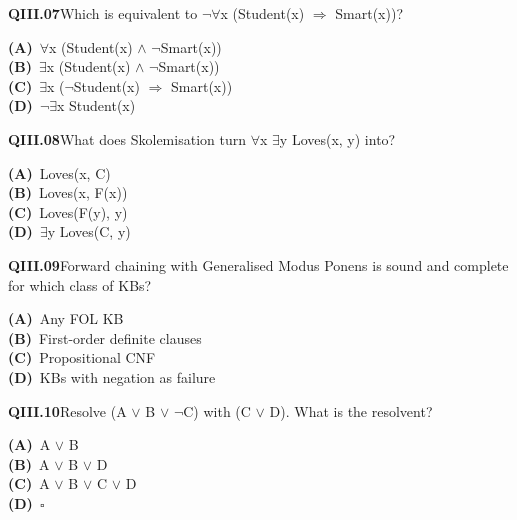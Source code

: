 \begin{tcolorbox}[enhanced,breakable,colback=white,colframe=navyL,arc=2mm,boxrule=0.7pt,left=3mm,right=3mm,top=2mm,bottom=2mm]
\textbf{\color{navy}QIII.07}\quad Which is equivalent to $\neg$$\forall$x (Student(x) $\Rightarrow$ Smart(x))?\hfill{}\par\smallskip
{\small \textbf{\color{navyL}(A)}\ $\forall$x (Student(x) $\wedge$ $\neg$Smart(x))\\[1pt]\textbf{\color{navyL}(B)}\ $\exists$x (Student(x) $\wedge$ $\neg$Smart(x))\\[1pt]\textbf{\color{navyL}(C)}\ $\exists$x ($\neg$Student(x) $\Rightarrow$ Smart(x))\\[1pt]\textbf{\color{navyL}(D)}\ $\neg$$\exists$x Student(x)}
\end{tcolorbox}
\begin{tcolorbox}[enhanced,breakable,colback=white,colframe=navyL,arc=2mm,boxrule=0.7pt,left=3mm,right=3mm,top=2mm,bottom=2mm]
\textbf{\color{navy}QIII.08}\quad What does Skolemisation turn $\forall$x $\exists$y Loves(x, y) into?\hfill{}\par\smallskip
{\small \textbf{\color{navyL}(A)}\ Loves(x, C)\\[1pt]\textbf{\color{navyL}(B)}\ Loves(x, F(x))\\[1pt]\textbf{\color{navyL}(C)}\ Loves(F(y), y)\\[1pt]\textbf{\color{navyL}(D)}\ $\exists$y Loves(C, y)}
\end{tcolorbox}
\begin{tcolorbox}[enhanced,breakable,colback=white,colframe=navyL,arc=2mm,boxrule=0.7pt,left=3mm,right=3mm,top=2mm,bottom=2mm]
\textbf{\color{navy}QIII.09}\quad Forward chaining with Generalised Modus Ponens is sound and complete for which class of KBs?\hfill{}\par\smallskip
{\small \textbf{\color{navyL}(A)}\ Any FOL KB\\[1pt]\textbf{\color{navyL}(B)}\ First-order definite clauses\\[1pt]\textbf{\color{navyL}(C)}\ Propositional CNF\\[1pt]\textbf{\color{navyL}(D)}\ KBs with negation as failure}
\end{tcolorbox}
\begin{tcolorbox}[enhanced,breakable,colback=white,colframe=navyL,arc=2mm,boxrule=0.7pt,left=3mm,right=3mm,top=2mm,bottom=2mm]
\textbf{\color{navy}QIII.10}\quad Resolve (A $\vee$ B $\vee$ $\neg$C) with (C $\vee$ D). What is the resolvent?\hfill{}\par\smallskip
{\small \textbf{\color{navyL}(A)}\ A $\vee$ B\\[1pt]\textbf{\color{navyL}(B)}\ A $\vee$ B $\vee$ D\\[1pt]\textbf{\color{navyL}(C)}\ A $\vee$ B $\vee$ C $\vee$ D\\[1pt]\textbf{\color{navyL}(D)}\ $\square$}
\end{tcolorbox}
